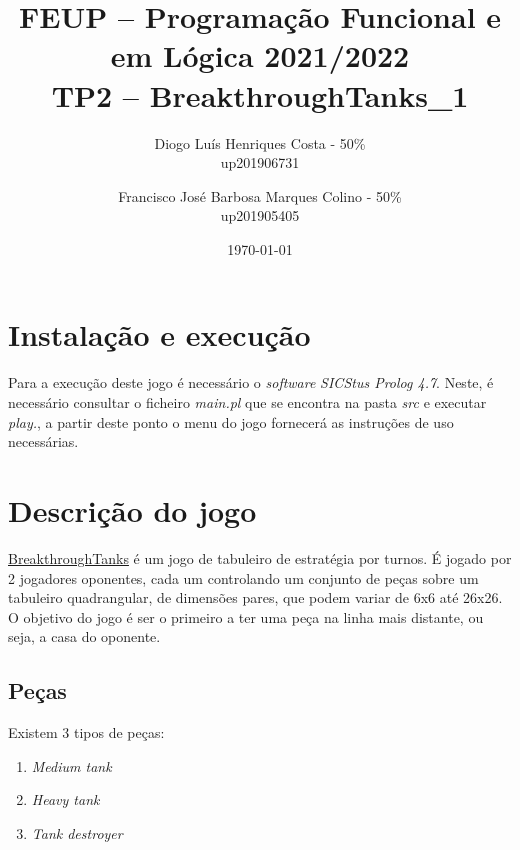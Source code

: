 \documentclass[a4paper,11pt,portuguese]{article}
\begin{document}

\author{
    Diogo Luís Henriques Costa - 50\% \\
    up201906731
    \and
    Francisco José Barbosa Marques Colino - 50\% \\
    up201905405
}
\title{FEUP -- Programação Funcional e em Lógica \large 2021/2022 \\ \large TP2 -- BreakthroughTanks\_1}
\date{\today}
\maketitle


\section{Instalação e execução}

Para a execução deste jogo é necessário o \textit{software} \textit{SICStus Prolog 4.7}. Neste, é necessário consultar o ficheiro
\textit{main.pl} que se encontra na pasta \textit{src} e executar \textit{play.}, a partir  deste ponto o menu 
do jogo fornecerá as instruções de uso necessárias.


\section{Descrição do jogo}

\href{https://boardgamegeek.com/boardgame/321224/breakthrough-tanks}{BreakthroughTanks}
é um jogo de tabuleiro de estratégia por turnos. É jogado por 2 jogadores oponentes, cada 
um controlando um conjunto de peças sobre um tabuleiro quadrangular, de dimensões pares, que podem variar
de 6x6 até 26x26. O objetivo do jogo é ser o primeiro a ter uma peça na linha mais distante, ou seja, a casa do oponente. 

\subsection{Peças}

\noindent Existem 3 tipos de peças:

\begin{enumerate}[topsep=4pt,itemsep=2pt]
    \item \textit{Medium tank}
    \item \textit{Heavy tank}
    \item \textit{Tank destroyer}
\end{enumerate}
\end{document}
